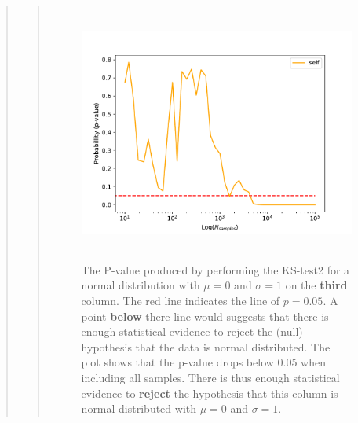 \begin{quote}
\begin{quote}
\begin{figure}[!ht]
\centering
\includegraphics[width=14cm, height=8.5cm]{./Plots/1e_plot_column_2.pdf}
\caption{The P-value produced by performing the KS-test2 for a normal distribution with $\mu = 0$ and $\sigma = 1$ on the \textbf{third} column.  The red line indicates the line of $ p = 0.05$. A point \textbf{below} there  line would suggests that there is enough statistical evidence to reject the (null) hypothesis that the data is normal distributed. The plot shows that the p-value drops below 0.05 when including all samples. There is thus enough statistical evidence to \textbf{reject} the hypothesis that this column is normal distributed with $\mu = 0$ and $\sigma = 1$.}
\end{figure}


\end{quote}
\end{quote}
